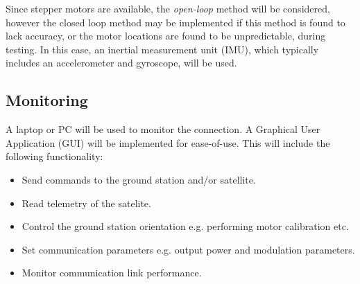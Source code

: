 Since stepper motors are available, the \textit{open-loop} method will be considered, however the closed loop method may be implemented if this method is found to lack accuracy, or the motor locations are found to be unpredictable, during testing. In this case, an inertial measurement unit (IMU), which typically includes an accelerometer and gyroscope, will be used.

\subsection{Monitoring}
A laptop or PC will be used to monitor the connection. A Graphical User Application (GUI) will be implemented for ease-of-use. This will include the following functionality:
\begin{itemize}
    \item Send commands to the ground station and/or satellite.
    \item Read telemetry of the satelite.
    \item Control the ground station orientation e.g. performing motor calibration etc.
    \item Set communication parameters e.g. output power and modulation parameters.
    \item Monitor communication link performance.
\end{itemize}